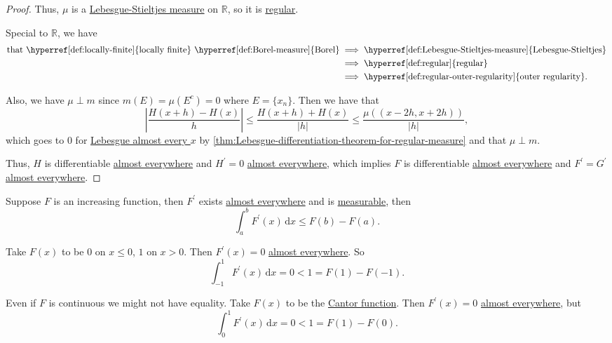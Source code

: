 \begin{proof}
	Thus, \(\mu\) is a \hyperref[def:Lebesgue-Stieltjes-measure]{Lebesgue-Stieltjes measure} on \(\mathbb{R}\), so it is \hyperref[def:regular]{regular}.
	\begin{remark}
		Special to \(\mathbb{R}\), we have
		\[
			\begin{split}
				\text{that \hyperref[def:locally-finite]{locally finite} \hyperref[def:Borel-measure]{Borel}}
				&\implies \text{\hyperref[def:Lebesgue-Stieltjes-measure]{Lebesgue-Stieltjes}}\\
				&\implies \text{\hyperref[def:regular]{regular}}\\
				&\implies \text{\hyperref[def:regular-outer-regularity]{outer regularity}}.
			\end{split}
		\]
	\end{remark}
	Also, we have \(\mu \perp m\) since \(m(E) = \mu (E^{c} ) = 0\) where \(E = \{x_n\}\). Then we have that
	\[
		\left\vert \frac{H(x + h) - H(x)}{h} \right\vert \leq \frac{H(x + h) + H(x)}{\left\vert h \right\vert} \leq \frac{\mu((x-2h,x+2h))}{\left\vert h \right\vert},
	\]
	which  goes to \(0\) for \hyperref[def:mu-almost-everywhere]{Lebesgue almost every \(x\)} by \autoref{thm:Lebesgue-differentiation-theorem-for-regular-measure}
	and that \(\mu \perp m\).

	Thus, \(H\) is differentiable \hyperref[def:mu-almost-everywhere]{almost everywhere} and \(H^\prime = 0\) \hyperref[def:mu-almost-everywhere]{almost everywhere},
	which implies \(F\) is differentiable \hyperref[def:mu-almost-everywhere]{almost everywhere} and \(F^\prime = G^\prime\) \hyperref[def:mu-almost-everywhere]{almost everywhere}.
\end{proof}

\begin{proposition}\label{prop:FTC-inequality}
	Suppose \(F\) is an increasing function, then \(F^\prime\) exists \hyperref[def:mu-almost-everywhere]{almost everywhere} and is
	\hyperref[def:measurable-function]{measurable}, then
	\[
		\int_a^b F^\prime (x) \,\mathrm{d}x \leq F(b) - F(a).
	\]
\end{proposition}

\begin{eg}
	Take \(F(x)\) to be \(0\) on \(x \leq 0\), \(1\) on \(x > 0\). Then \(F^\prime(x) = 0\) \hyperref[def:mu-almost-everywhere]{almost everywhere}. So
	\[
		\int_{-1}^1 F^\prime(x) \,\mathrm{d}x = 0 < 1 = F(1) - F(-1).
	\]

	Even if \(F\) is continuous we might not have equality. Take \(F(x)\) to be the \hyperref[sssec:Cantor-Function]{Cantor function}.
	Then \(F^\prime(x) = 0\) \hyperref[def:mu-almost-everywhere]{almost everywhere}, but
	\[
		\int_0^1 F^\prime(x) \,\mathrm{d}x = 0 < 1 = F(1) - F(0).
	\]
\end{eg}